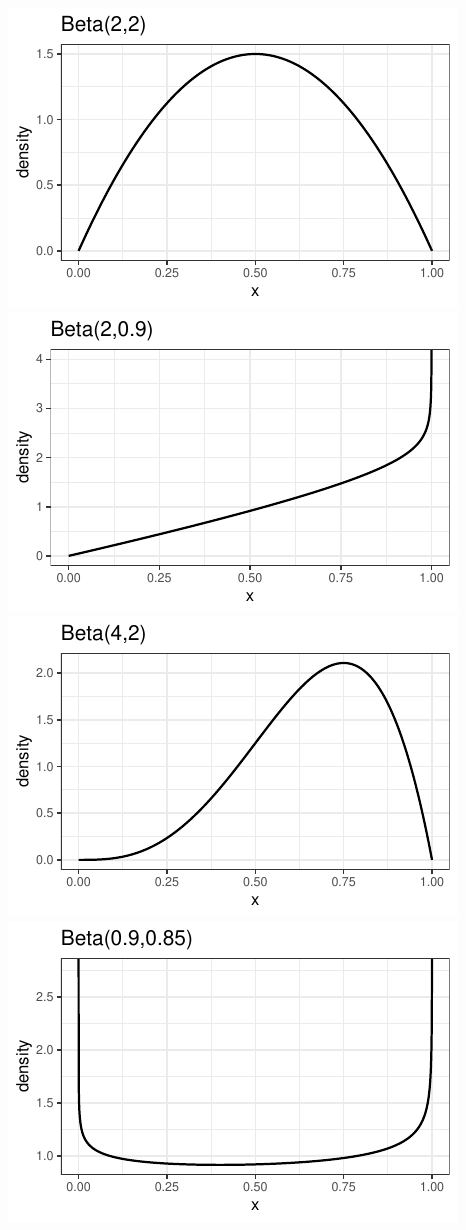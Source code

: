 \documentclass[twoside]{book}\usepackage[]{graphicx}\usepackage[]{xcolor}
\makeatletter
\def\maxwidth{ %
  \ifdim\Gin@nat@width>\linewidth
    \linewidth
  \else
    \Gin@nat@width
  \fi
}
\newenvironment{knitrout}{}{} %
\makeatother
\begin{document}
\begin{knitrout}
{\centering \includegraphics[width=\maxwidth]{figures/fig-unnamed-chunk-86-1} 
\includegraphics[width=\maxwidth]{figures/fig-unnamed-chunk-86-2} 
\includegraphics[width=\maxwidth]{figures/fig-unnamed-chunk-86-3} 
\includegraphics[width=\maxwidth]{figures/fig-unnamed-chunk-86-4} 

}
\end{knitrout}
\end{document}
